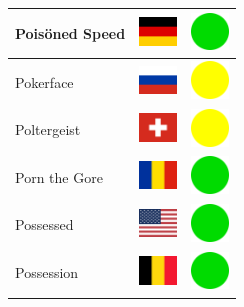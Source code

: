 \documentclass[12pt, a4paper, twoside]{report}
\begin{document}
\begin{center}
\begin{longtable}{|p{5cm}|p{2cm}|p{2cm}|}
 Poisöned Speed                                             & \includegraphics[width=1cm]{4x3/de} &   \includegraphics[width=1cm]{likes/y} \\ \hline
 Pokerface                                                  & \includegraphics[width=1cm]{4x3/ru} &   \includegraphics[width=1cm]{likes/m} \\ \hline
 Poltergeist                                                & \includegraphics[width=1cm]{4x3/ch} &   \includegraphics[width=1cm]{likes/m} \\ \hline
 Porn the Gore                                              & \includegraphics[width=1cm]{4x3/ro} &   \includegraphics[width=1cm]{likes/y} \\ \hline
 Possessed                                                  & \includegraphics[width=1cm]{4x3/us} &   \includegraphics[width=1cm]{likes/y} \\ \hline
 Possession                                                 & \includegraphics[width=1cm]{4x3/be} &   \includegraphics[width=1cm]{likes/y} \\ \hline

\end{longtable}
\end{center}
\end{document}
